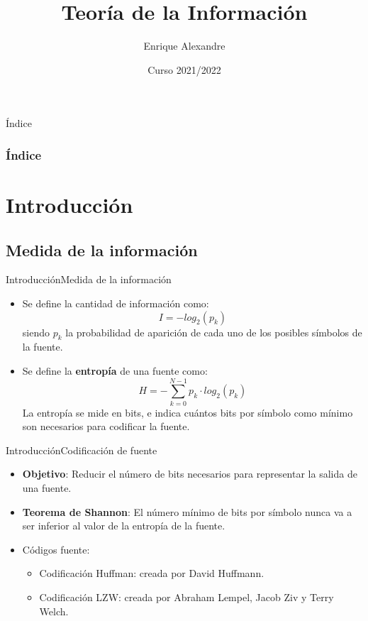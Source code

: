 \documentclass[10pt,compress]{beamer} %
\title[Teoría de la Información]{Teoría de la Información}
\author{Enrique Alexandre}
\institute{Dpto. de Teoría de la Señal y Comunicaciones}
\date{Curso 2021/2022}
\begin{document}
{\titlepageBlue
    \begin{frame}
        \titlepage
    \end{frame}
}

{
\begin{frame}[shrink]{Índice}
 \frametitle{Índice}
 \tableofcontents
\end{frame}
}

\section{Introducción}

\subsection{Medida de la información}

\begin{frame}{Introducción}{Medida de la información}
    \begin{itemize}
		\item Se define la cantidad de información como:
		\begin{displaymath}
        I = -log_2(p_k)
    \end{displaymath}
      siendo $p_k$ la probabilidad de aparición de cada uno de los posibles símbolos de la fuente. 
    
    \item Se define la {\bf entropía} de una fuente como:
    \begin{displaymath}
      H = - \sum_{k=0}^{N-1}p_k \cdot  log_2(p_k)
    \end{displaymath}
    La entropía se mide en bits, e indica cuántos bits por símbolo como mínimo son necesarios para codificar la fuente.
	\end{itemize}
\end{frame}

\begin{frame}{Introducción}{Codificación de fuente}
  \begin{itemize}
  \item {\bf Objetivo}: Reducir el número de bits necesarios para representar la salida de una fuente. 
  \item {\bf Teorema de Shannon}: El número mínimo de bits por símbolo nunca va a ser inferior al valor de la entropía de la fuente.
  \item Códigos fuente:
  \begin{itemize}
    \item Codificación Huffman: creada por David Huffmann.
    \item Codificación LZW: creada por Abraham Lempel, Jacob Ziv y Terry Welch. 
  \end{itemize}
\end{itemize}
\end{frame}
\end{document}
